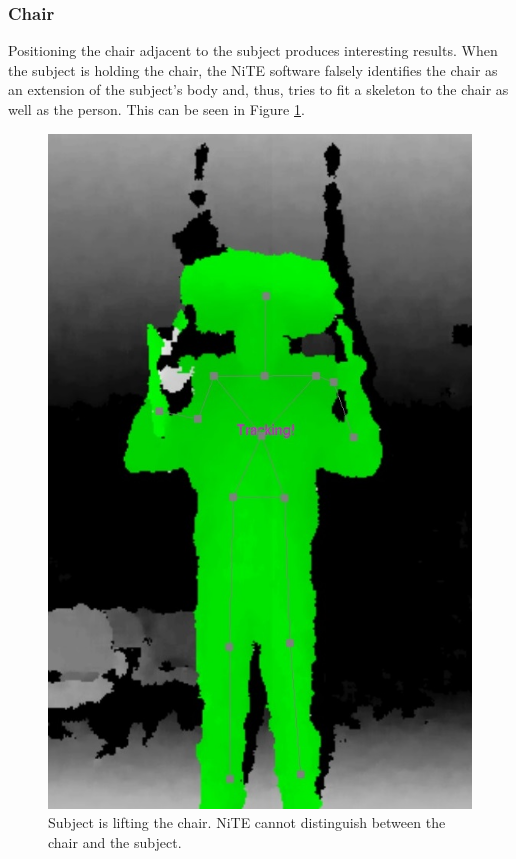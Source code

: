 \documentclass[10pt]{article}
\begin{document}
\subsubsection{Chair}
\noindent Positioning the chair adjacent to the subject produces interesting results. When the subject is holding the chair, the NiTE software falsely identifies the chair as an extension of the subject's body and, thus, tries to fit a skeleton to the chair as well as the person. This can be seen in Figure \ref{lifting_chair}.

\begin{figure}[H]
\center
\includegraphics[scale=0.2]{Head_Chair.jpg} 
\caption{Subject is lifting the chair. NiTE cannot distinguish between the chair and the subject.}
\label{lifting_chair}
\end{figure}
\end{document}
